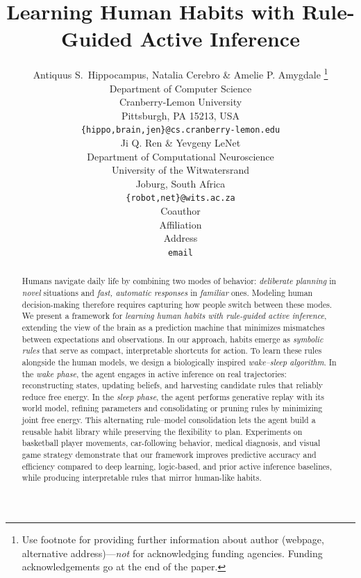 \documentclass{article} %
\title{Learning Human Habits with Rule-Guided Active Inference}
\author{Antiquus S.~Hippocampus, Natalia Cerebro \& Amelie P. Amygdale \thanks{ Use footnote for providing further information
about author (webpage, alternative address)---\emph{not} for acknowledging
funding agencies.  Funding acknowledgements go at the end of the paper.} \\
Department of Computer Science\\
Cranberry-Lemon University\\
Pittsburgh, PA 15213, USA \\
\texttt{\{hippo,brain,jen\}@cs.cranberry-lemon.edu} \\
\And
Ji Q. Ren \& Yevgeny LeNet \\
Department of Computational Neuroscience \\
University of the Witwatersrand \\
Joburg, South Africa \\
\texttt{\{robot,net\}@wits.ac.za} \\
\AND
Coauthor \\
Affiliation \\
Address \\
\texttt{email}
}
\begin{document}
\maketitle

\begin{abstract}
Humans navigate daily life by combining two modes of behavior: {\it deliberate planning} in {\it novel} situations and {\it fast, automatic responses} in {\it familiar} ones. Modeling human decision-making therefore requires capturing how people switch between these modes. We present a framework for \emph{learning human habits with rule-guided active inference}, extending the view of the brain as a prediction machine that minimizes mismatches between expectations and observations. In our approach, habits emerge as \emph{symbolic rules} that serve as compact, interpretable shortcuts for action. To learn these rules alongside the human models, we design a biologically inspired \emph{wake--sleep algorithm}. In the \emph{wake phase}, the agent engages in active inference on real trajectories: reconstructing states, updating beliefs, and harvesting candidate rules that reliably reduce free energy. In the \emph{sleep phase}, the agent performs generative replay with its world model, refining parameters and consolidating or pruning rules by minimizing joint free energy. This alternating rule–model consolidation lets the agent build a reusable habit library while preserving the flexibility to plan. Experiments on basketball player movements, car-following behavior, medical diagnosis, and visual game strategy demonstrate that our framework improves predictive accuracy and efficiency compared to deep learning, logic-based, and prior active inference baselines, while producing interpretable rules that mirror human-like habits.
\end{abstract}
\end{document}
